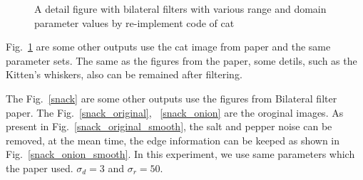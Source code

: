 \documentclass[12pt]{article}
\begin{document}
\begin{figure}[H]
  \quad
  \quad
  \quad
  \caption{A detail figure with bilateral filters with various range and domain parameter values by re-implement code of cat}
  \label{im_cat}
  \end{figure}

Fig.~\ref{im_cat} are some other outputs use the cat image from paper and the same parameter sets. 
The same as the figures from the paper, some detils, such as the Kitten's whiskers, also can be remained after filtering.

The Fig.~\ref{snack} are some other outputs use the figures from Bilateral filter paper.  
The Fig.~\ref{snack_original}, ~\ref{snack_onion} are the oroginal images.
As present in Fig.~\ref{snack_original_smooth}, the salt and pepper noise can be removed, at the mean time, the edge information can be keeped as shown in Fig.~\ref{snack_onion_smooth}.
In this experiment, we use same parameters which the paper used. $\sigma_d = 3$ and $\sigma_r = 50$. 
\end{document}
